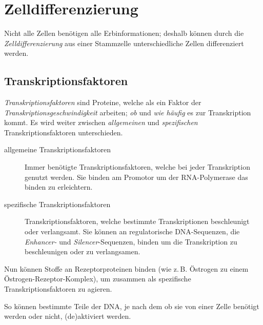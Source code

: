 \documentclass{article}
\begin{document}
\section{Zelldifferenzierung} 
Nicht alle Zellen benötigen alle Erbinformationen; deshalb können durch die \emph{Zelldifferenzierung} aus einer Stammzelle unterschiedliche Zellen differenziert werden.
 
\subsection{Transkriptionsfaktoren}
\emph{Transkriptionsfaktoren} sind Proteine, welche als ein Faktor der \emph{Transkriptionsgeschwindigkeit} arbeiten; \emph{ob} und \emph{wie häufig} es zur Transkription kommt. Es wird weiter zwischen \emph{allgemeinen} und \emph{spezifischen} Transkriptionsfaktoren unterschieden.
\begin{description}
 \item[allgemeine Transkriptionsfaktoren] Immer benötigte Transkriptionsfaktoren, welche bei jeder Transkription genutzt werden. Sie binden am Promotor um der RNA-Polymerase das binden zu erleichtern.
 \item[spezifische Transkriptionsfaktoren] Transkriptionsfaktoren, welche bestimmte Transkriptionen beschleunigt oder verlangsamt. Sie können an regulatorische DNA-Sequenzen, die  \emph{Enhancer-} und \emph{Silencer}-Sequenzen, binden um die Transkription zu beschleunigen oder zu verlangsamen.
\end{description}
Nun können Stoffe an Rezeptorproteinen binden (wie z.\,B. Östrogen zu einem Östrogen-Rezeptor-Komplex), um zusammen als spezifische Transkriptionsfaktoren zu agieren. 
 
So können bestimmte Teile der DNA, je nach dem ob sie von einer Zelle benötigt werden oder nicht, (de)aktiviert werden. 
\end{document}
